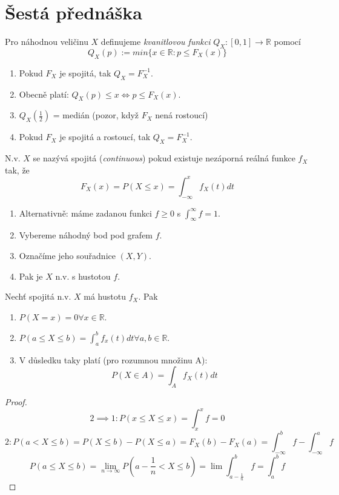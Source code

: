 \documentclass[../main.tex]{subfiles}
\begin{document}
\section{Šestá přednáška}

\begin{definition}
    Pro náhodnou veličinu $X$ definujeme \textit{kvanitlovou funkci} 
    $Q_X : [0,1] \rightarrow \mathbb{R}$ pomocí
    \[Q_X(p) := min \{x \in \mathbb{R} : p \leq F_X(x)\}\]
    \begin{enumerate}
        \item Pokud $F_X$ je spojitá, tak $Q_X = F^{-1}_X.$
        \item Obecně platí: $Q_X(p) \leq x \Leftrightarrow p \leq F_X(x)$.
        \item $Q_X(\frac{1}{2})$ = medián (pozor, když  $F_X$ nená rostoucí)
        \item Pokud $F_X$ je spojitá a rostoucí, tak $Q_X = F^{-1}_X$.
    \end{enumerate}
\end{definition}

\begin{definition}
    N.v. $X$ se nazývá spojitá (\textit{continuous}) pokud existuje nezáporná reálná funkce $f_X$ tak, že
    \[F_X(x) = P(X \leq x) = \int^x_{-\infty} f_X(t)dt\]
    \begin{enumerate}
        \item Alternativně: máme zadanou funkci $f \geq 0$ s $\int^\infty_\infty f = 1$.
        \item Vybereme náhodný bod pod grafem $f$.
        \item Označíme jeho souřadnice $(X,Y)$.
        \item Pak je $X$ n.v. s hustotou $f$.
    \end{enumerate}
\end{definition}

\begin{theorem}
    Nechť spojitá n.v. $X$ má hustotu $f_X$. Pak
    \begin{enumerate}
        \item $P(X=x) = 0 \forall x \in \mathbb{R}$.
        \item $P(a\leq X \leq b) = \int^b_a f_x(t) dt \forall a,b \in \mathbb{R}$.
        \item V důsledku taky platí (pro rozumnou množinu A):
            \[P(X\in A) = \int_A f_X(t) dt\]
    \end{enumerate} 
\end{theorem}
\begin{proof}
    \[2 \implies 1 : P(x\leq X\leq x) = \int^x_x f = 0\]
    \[2 :  P(a < X \leq b) = P(X\leq b) - P(X\leq a) = F_X(b) - F_X(a) = \int^b_{-\infty} f - \int^a_{-\infty} f\]
    \[P(a\leq X \leq b) = \lim_{n\rightarrow \infty} P(a-\frac{1}{n} < X \leq b) = \lim \int^b_{a-\frac{1}{n}} f = \int^b_a f\]
\end{proof}
\end{document}
